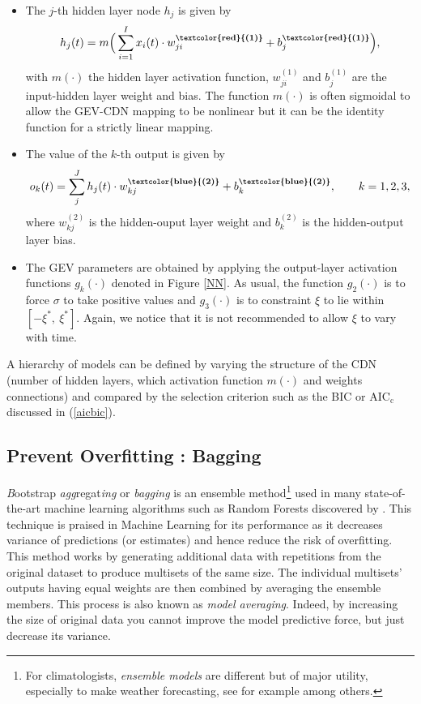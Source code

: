 \begin{itemize} 

\item The $j$-th hidden layer node $h_j$ is given by 
\begin{equation}\label{eq:nnlay1}
h_j(t)=m\Big(\sum_{i=1}^{I}x_i(t)\cdot  w_{ji}^{\textbf{\textcolor{red}{(1)}}}+b_j^{\textbf{\textcolor{red}{(1)}}}\Big),
\end{equation}
with $m(\cdot)$ the hidden layer activation function, $w_{ji}^{(1)}$ and $b_j^{(1)}$ are the input-hidden layer weight and bias. The function $m(\cdot)$ is often sigmoidal to allow the GEV-CDN mapping to be nonlinear but it can be the identity function for a strictly linear mapping.

\item The value of the $k$-th output is given by 
\begin{equation}\label{eq:nnlay2}
o_k(t)=\sum_j^Jh_j(t)\cdot w_{kj}^{\textbf{\textbf{\textcolor{blue}{(2)}}}}+b^{\textbf{\textbf{\textcolor{blue}{(2)}}}}_k, \qquad k=1,2,3 ,
\end{equation}
where $w_{kj}^{(2)}$ is the hidden-ouput layer weight and $b^{(2)}_k$ is the hidden-output layer bias.
	
\item The GEV parameters are obtained by applying the output-layer activation functions $g_k(\cdot)$ denoted in Figure \ref{NN}. As usual, the function $g_2(\cdot)$ is to force $\sigma$ to take positive values and $g_3(\cdot)$ is to constraint $\xi$ to lie within $[-\xi^{*},\ \xi^{*}]$. Again, we notice that it is not recommended to allow $\xi$ to vary with time. 
	
\end{itemize}
A hierarchy of models can be defined by varying the structure of the CDN (number of hidden layers, which activation function $m(\cdot)$ and weights connections)  and compared by the selection criterion such as the BIC or $\text{AIC}_{\text{c}}$ discussed in (\ref{aicbic}). 


\subsection{Prevent Overfitting : Bagging}\label{sec:bagg} 


\emph{B}ootstrap \emph{agg}regat\emph{ing} or \emph{bagging} is an ensemble method\footnote{For climatologists, \emph{ensemble models} are different but of major utility, especially to make weather forecasting, see for example \citet{suh_development_2012} among others.} used in many state-of-the-art machine learning algorithms such as Random Forests discovered by \citet{Breiman_2001}. This technique is praised in Machine Learning for its performance as it decreases variance of predictions (or estimates) and hence reduce the risk of overfitting. This method works by generating additional data with repetitions from the original dataset to produce multisets of the same size.
The  individual  multisets’  outputs  having equal  weights  are  then  combined  by  averaging the ensemble members. This process is also known as \emph{model averaging}.
Indeed, by increasing the size of original data you cannot improve the model predictive force, but just decrease its variance.

